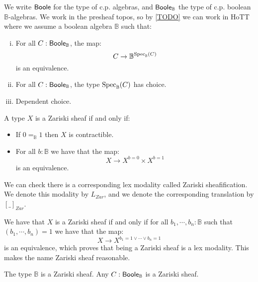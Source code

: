 We write $\mathsf{Boole}$ for the type of c.p. algebras, and $\mathsf{Boole}_{\mathbb{B}}$ the type of c.p. boolean $\mathbb{B}$-algebras. We work in the presheaf topos, so by \cref{TODO} we can work in HoTT where we assume a boolean algebra $\mathbb{B}$ such that:

\begin{enumerate}[(i)]
\item For all $C:\mathsf{Boole}_\mathbb{B}$, the map:
\[C \to \mathbb{B}^{\operatorname{Spec}_\mathbb{B}(C)}\]
is an equivalence.
\item For all $C:\mathsf{Boole}_\mathbb{B}$, the type $\operatorname{Spec}_\mathbb{B}(C)$ has choice.
\item Dependent choice.
\end{enumerate}

\begin{definition}\label{zariski-characterisation}
A type $X$ is a Zariski sheaf if and only if:
\begin{itemize}
\item If $0=_\mathbb{B}1$ then $X$ is contractible.
\item For all $b:\mathbb{B}$ we have that the map:
\[X\to X^{b=0}\times X^{b=1}\]
is an equivalence.
\end{itemize}
\end{definition}

We can check there is a corresponding lex modality called Zariski sheafification. We denote this modality by $L_{Zar}$, and we denote the corresponding translation by $[\_]_{Zar}$.

\begin{remark}
We have that $X$ is a Zariski sheaf if and only if for all $b_1,\cdots,b_n:\mathbb{B}$ such that $(b_1,\cdots,b_n)=1$ we have that the map:
\[X\to X^{b_1=1\lor\cdots\lor b_n=1}\]
is an equivalence, which proves that being a Zariski sheaf is a lex modality. This makes the name Zariski sheaf reasonable.
\end{remark}


\begin{lemma}\label{zariski-subcanonical}
The type $\mathbb{B}$ is a Zariski sheaf. Any $C:\mathsf{Boole}_\mathbb{B}$ is a Zariski sheaf.
\end{lemma}

